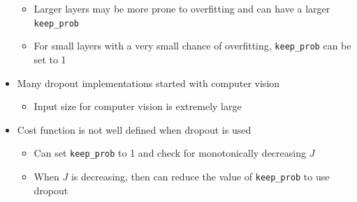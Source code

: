 \documentclass[12pt, letterpaper]{article}
\begin{document}
\begin{itemize}
        \begin{itemize}
            \item Larger layers may be more prone to overfitting and can have a larger \texttt{keep\_prob}
            \item For small layers with a very small chance of overfitting, \texttt{keep\_prob} can be set to 1
        \end{itemize}
        \item Many dropout implementations started with computer vision
        \begin{itemize}
            \item Input size for computer vision is extremely large
        \end{itemize}
        \item Cost function is not well defined when dropout is used
        \begin{itemize}
            \item Can set \texttt{keep\_prob} to 1 and check for monotonically decreasing $J$
            \item When $J$ is decreasing, then can reduce the value of \texttt{keep\_prob} to use dropout
        \end{itemize}
    \end{itemize}
    
\end{document}
